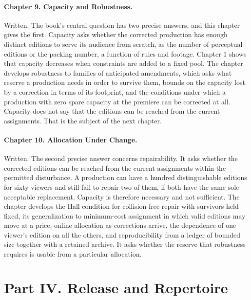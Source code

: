 \documentclass[11pt]{article}
\begin{document}
\paragraph{Chapter 9. Capacity and Robustness.} Written. The book's central question has two precise answers, and this chapter gives the first. Capacity asks whether the corrected production has enough distinct editions to serve its audience from scratch, as the number of perceptual editions or the packing number, a function of rules and footage. Chapter 1 shows that capacity decreases when constraints are added to a fixed pool. The chapter develops robustness to families of anticipated amendments, which asks what reserve a production needs in order to survive them, bounds on the capacity lost by a correction in terms of its footprint, and the conditions under which a production with zero spare capacity at the premiere can be corrected at all. Capacity does not say that the editions can be reached from the current assignments. That is the subject of the next chapter.

\paragraph{Chapter 10. Allocation Under Change.} Written. The second precise answer concerns repairability. It asks whether the corrected editions can be reached from the current assignments within the permitted disturbance. A production can have a hundred distinguishable editions for sixty viewers and still fail to repair two of them, if both have the same sole acceptable replacement. Capacity is therefore necessary and not sufficient. The chapter develops the Hall condition for collision-free repair with survivors held fixed, its generalization to minimum-cost assignment in which valid editions may move at a price, online allocation as corrections arrive, the dependence of one viewer's edition on all the others, and reproducibility from a ledger of bounded size together with a retained archive. It asks whether the reserve that robustness requires is usable from a particular allocation.

\section*{Part IV. Release and Repertoire}
\end{document}

